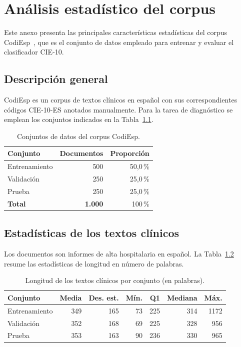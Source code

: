 \chapter{Análisis estadístico del corpus}
\label{cap:AnexoG}

Este anexo presenta las principales características estadísticas del corpus CodiEsp~\cite{miranda2020}, que es el conjunto de datos empleado para entrenar y evaluar el clasificador CIE-10.

\section{Descripción general}

CodiEsp es un corpus de textos clínicos en español con sus correspondientes códigos CIE-10-ES anotados manualmente. Para la tarea de diagnóstico se emplean los conjuntos indicados en la Tabla~\ref{tab:codiesp-splits}.

\begin{table}[h]
\centering
\caption{Conjuntos de datos del corpus CodiEsp.}
\label{tab:codiesp-splits}
\begin{tabular}{lrr}
\hline
\textbf{Conjunto} & \textbf{Documentos} & \textbf{Proporción} \\
\hline
Entrenamiento & 500 & 50{,}0\,\% \\
Validación & 250 & 25{,}0\,\% \\
Prueba & 250 & 25{,}0\,\% \\
\hline
\textbf{Total} & \textbf{1.000} & 100\,\% \\
\hline
\end{tabular}
\end{table}

\section{Estadísticas de los textos clínicos}

Los documentos son informes de alta hospitalaria en español. La Tabla~\ref{tab:text-stats} resume las estadísticas de longitud en número de palabras.

\begin{table}[h]
\centering
\caption{Longitud de los textos clínicos por conjunto (en palabras).}
\label{tab:text-stats}
\begin{tabular}{lrrrrrr}
\hline
\textbf{Conjunto} & \textbf{Media} & \textbf{Des. est.} & \textbf{Mín.} & \textbf{Q1} & \textbf{Mediana} & \textbf{Máx.} \\
\hline
Entrenamiento & 349 & 165 & 73 & 225 & 314 & 1172 \\
Validación & 352 & 168 & 69 & 225 & 328 & 956 \\
Prueba & 353 & 163 & 90 & 236 & 330 & 965 \\
\hline
\end{tabular}
\end{table}

